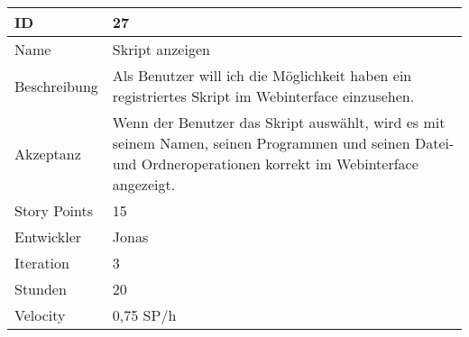 \begin{table}[htbp]
    \begin{minipage}{\linewidth}
        \setlength{\tymax}{0.5\linewidth}
        \centering
        \small
        \begin{tabulary}{\textwidth}{|l|p{10cm}|} \hline
            ID   &27\\\hline
            Name  &Skript anzeigen\\\hline
            Beschreibung&Als Benutzer will ich die Möglichkeit haben ein registriertes Skript im Webinterface einzusehen.\\\hline
	    Akzeptanz &Wenn der Benutzer das Skript auswählt, wird es mit seinem Namen, seinen Programmen und seinen Datei- und Ordneroperationen korrekt im Webinterface angezeigt.\\\hline
            Story Points&15\\\hline
            Entwickler &Jonas\\\hline
            Iteration &3\\\hline
            Stunden  &20\\\hline
            Velocity &0,75 SP\slash h\\\hline
        \end{tabulary}
    \end{minipage}
\end{table}



